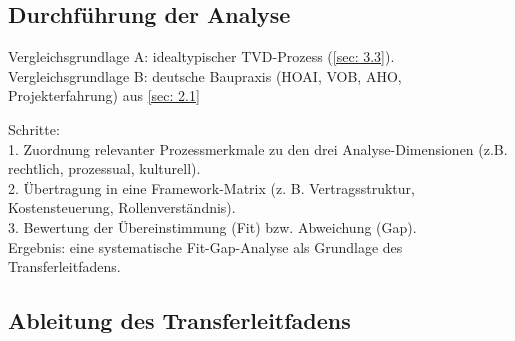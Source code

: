 \subsection{Durchführung der Analyse}
\label{sec: 3.4.3}

Vergleichsgrundlage A: idealtypischer TVD-Prozess (\cref{sec: 3.3}).\\
Vergleichsgrundlage B: deutsche Baupraxis (HOAI, VOB, AHO, Projekterfahrung) aus \cref{sec: 2.1}

Schritte:\\
1. Zuordnung relevanter Prozessmerkmale zu den drei Analyse-Dimensionen (z.B. rechtlich, prozessual, kulturell).\\
2. Übertragung in eine Framework-Matrix (z. B. Vertragsstruktur, Kostensteuerung, Rollenverständnis).\\
3. Bewertung der Übereinstimmung (Fit) bzw. Abweichung (Gap).\\
Ergebnis: eine systematische Fit-Gap-Analyse als Grundlage des Transferleitfadens.

\subsection{Ableitung des Transferleitfadens}
\label{sec: 3.4.4}


